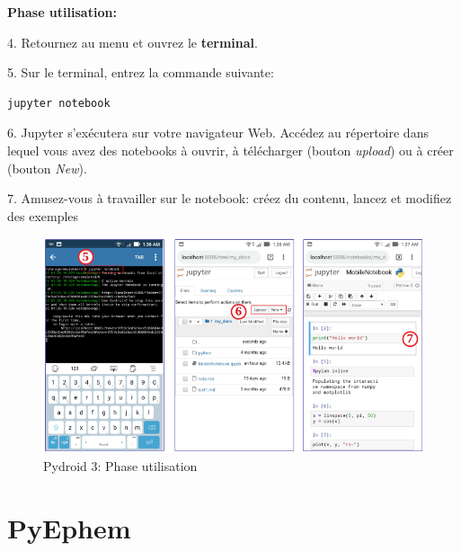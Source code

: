 \documentclass{beamer}
\begin{document}
\begin{frame}

\textbf{Phase utilisation:}

4. Retournez au menu et ouvrez le \textbf{terminal}.

5. Sur le terminal, entrez la commande suivante:

\begin{verbatim}
jupyter notebook
\end{verbatim}

6. Jupyter s'exécutera sur votre navigateur Web. Accédez au répertoire dans lequel vous avez des notebooks à ouvrir, à télécharger (bouton \emph{upload}) ou à créer (bouton \emph{New}).

7. Amusez-vous à travailler sur le notebook: créez du contenu, lancez et modifiez des exemples


\begin{figure}[!ht]  %
  \centerline{\includegraphics[width=0.7\linewidth]{figs/pydroid3_2.png}}
  \caption{
  Pydroid 3: Phase utilisation
  }
\end{figure}
\end{frame}

\section{PyEphem}
\end{document}
